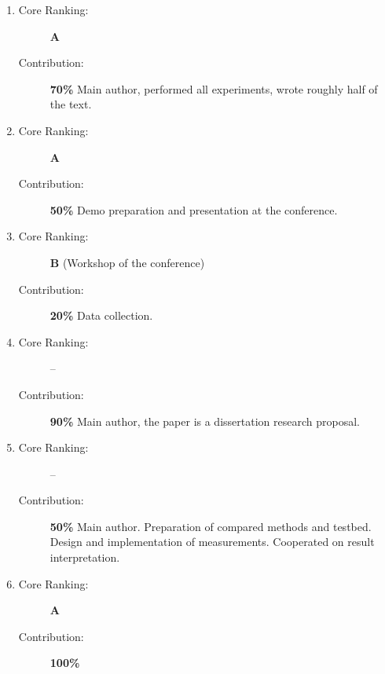 \begin{enumerate}
  \item {}
  \begin{description}
    \item[Core Ranking:] \textbf{A}
    \item[Contribution:] \textbf{70\%} Main author, performed all experiments, wrote roughly half of the text.
  \end{description}
  
  \item {}
  \begin{description}
    \item[Core Ranking:] \textbf{A}
    \item[Contribution:] \textbf{50\%} Demo preparation and presentation at the conference.
  \end{description}
  
  \item {}
  \begin{description}
    \item[Core Ranking:] \textbf{B} (Workshop of the conference)
    \item[Contribution:] \textbf{20\%} Data collection.
  \end{description}
  
  \item {}
  \begin{description}
    \item[Core Ranking:] --
    \item[Contribution:] \textbf{90\%} Main author, the paper is a dissertation research proposal.
  \end{description}
  
  \item {}
  \begin{description}
    \item[Core Ranking:] --
    \item[Contribution:] \textbf{50\%} Main author. Preparation of compared methods and testbed. Design and implementation of measurements. Cooperated on result interpretation.
  \end{description}
  
  \item {}
  \begin{description}
    \item[Core Ranking:] \textbf{A}
    \item[Contribution:] \textbf{100\%}
  \end{description}
  

\end{enumerate}
